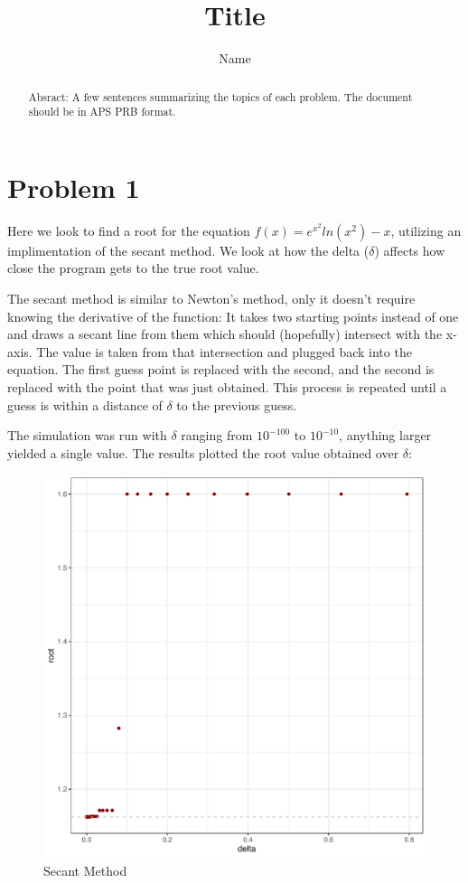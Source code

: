 \documentclass[prb,twocolumn]{revtex4-2}
\begin{document}
\title{Title}

\author{Name}


\begin{abstract}
Absract: A few sentences summarizing the topics of each problem.  The document should be in APS PRB format.  
\end{abstract}

\maketitle

\section{Problem 1}

\noindent
Here we look to find a root for the equation $f(x)=e^{x^2}ln(x^2)-x$, utilizing an implimentation of the secant method. We look at how the delta ($\delta$) affects how close the program gets to the true root value.

The secant method is similar to Newton's method, only it doesn't require knowing the derivative of the function: It takes two starting points instead of one and draws a secant line from them which should (hopefully) intersect with the x-axis. The value is taken from that intersection and plugged back into the equation. The first guess point is replaced with the second, and the second is replaced with the point that was just obtained. This process is repeated until a guess is within a distance of $\delta$ to the previous guess.

The simulation was run with $\delta$ ranging from $10^{-100}$ to $10^{-10}$, anything larger yielded a single value. The results plotted the root value obtained over $\delta$:

\begin{figure}[h!]
\centerline{\includegraphics [width=3 in] {secant}} \caption{Secant Method} \label{secant}
\end{figure}
\end{document}
